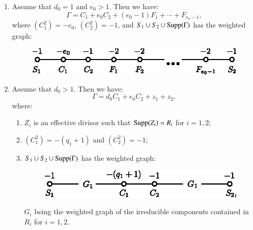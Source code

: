 \begin{lemma*}
\begin{enumerate}
\renewcommand{\labelenumi}{\rm(\theenumi)}
\item Assume that $d_{0}=1$ and $e_{0}>1$. Then we have:
$$
\Gamma=C_{1}+e_{0}C_{2}+(e_{0}-1)F_{1}+\cdots+F_{e_{0}-1},
$$
where $(C^{2}_{1})=-e_{0}$, $(C^{2}_{2})=-1$, and $S_{1}\cup
S_{2}\cup\operatorname{Supp}(\Gamma)$ has the weighted graph:
\begin{figure}[H]
\centering
\includegraphics[scale=1.2]{figures/chap2-fig34.eps}
\end{figure}

\item Assume that $d_{0}>1$. Then we have:
$$
\Gamma=d_{0}C_{1}+e_{0}C_{2}+z_{1}+z_{2},
$$
where:
\begin{enumerate}
\renewcommand{\theenumii}{\arabic{enumii}}
\renewcommand{\labelenumii}{\rm\theenumii$^{\circ}$}
\item $Z_{i}$ is an effective divisor such that $\operatorname{Supp}(Z_{i})=R_{i}$
  for $i=1,2$;

\item $(C^{2}_{1})=-(q_{1}+1)$ and $(C^{2}_{2})=-1$;

\item $S_{1}\cup S_{2}\cup \operatorname{Supp}(\Gamma)$ has the weighted graph:
\begin{figure}[H]
\centering
\includegraphics[scale=1.2]{figures/chap2-fig35.eps}
\end{figure}
\noindent
$G_{i}$ being the weighted graph of the irreducible components
contained in $R_{i}$ for $i=1,2$.
\end{enumerate}
\end{enumerate}
\end{lemma*}

